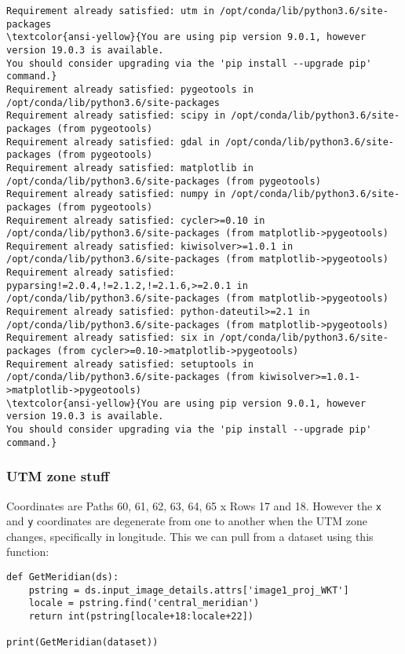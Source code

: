 \documentclass[11pt]{article}
\begin{document}
    \begin{Verbatim}[commandchars=\\\{\}]
Requirement already satisfied: utm in /opt/conda/lib/python3.6/site-packages
\textcolor{ansi-yellow}{You are using pip version 9.0.1, however version 19.0.3 is available.
You should consider upgrading via the 'pip install --upgrade pip' command.}
Requirement already satisfied: pygeotools in /opt/conda/lib/python3.6/site-packages
Requirement already satisfied: scipy in /opt/conda/lib/python3.6/site-packages (from pygeotools)
Requirement already satisfied: gdal in /opt/conda/lib/python3.6/site-packages (from pygeotools)
Requirement already satisfied: matplotlib in /opt/conda/lib/python3.6/site-packages (from pygeotools)
Requirement already satisfied: numpy in /opt/conda/lib/python3.6/site-packages (from pygeotools)
Requirement already satisfied: cycler>=0.10 in /opt/conda/lib/python3.6/site-packages (from matplotlib->pygeotools)
Requirement already satisfied: kiwisolver>=1.0.1 in /opt/conda/lib/python3.6/site-packages (from matplotlib->pygeotools)
Requirement already satisfied: pyparsing!=2.0.4,!=2.1.2,!=2.1.6,>=2.0.1 in /opt/conda/lib/python3.6/site-packages (from matplotlib->pygeotools)
Requirement already satisfied: python-dateutil>=2.1 in /opt/conda/lib/python3.6/site-packages (from matplotlib->pygeotools)
Requirement already satisfied: six in /opt/conda/lib/python3.6/site-packages (from cycler>=0.10->matplotlib->pygeotools)
Requirement already satisfied: setuptools in /opt/conda/lib/python3.6/site-packages (from kiwisolver>=1.0.1->matplotlib->pygeotools)
\textcolor{ansi-yellow}{You are using pip version 9.0.1, however version 19.0.3 is available.
You should consider upgrading via the 'pip install --upgrade pip' command.}

    \end{Verbatim}

    \hypertarget{utm-zone-stuff}{%
\subsubsection{UTM zone stuff}\label{utm-zone-stuff}}

Coordinates are Paths 60, 61, 62, 63, 64, 65 x Rows 17 and 18. However
the \texttt{x} and \texttt{y} coordinates are degenerate from one to
another when the UTM zone changes, specifically in longitude. This we
can pull from a dataset using this function:

\begin{verbatim}
def GetMeridian(ds):
    pstring = ds.input_image_details.attrs['image1_proj_WKT']
    locale = pstring.find('central_meridian')
    return int(pstring[locale+18:locale+22])

print(GetMeridian(dataset))
\end{verbatim}
\end{document}
